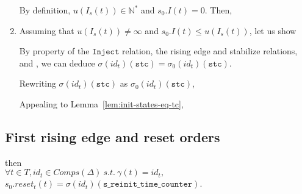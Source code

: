 \documentclass[dvipsnames,12pt]{article}
\begin{document}
\begin{niproof}
\begin{enumerate}
    By definition, $u(I_s(t))\in\mathbb{N}^{*}$ and
    $s_0.I(t)=0$. Then, 
    
  \item Assuming that $u(I_s(t))\neq\infty$ and
    $s_0.I(t)\le{}u(I_s(t))$, let us show\\

    By property of the $\mathtt{Inject}$ relation, the
    \hvhdl{} rising edge and stabilize relations, and \InCsCompT{}, we
    can deduce $\sigma(id_t)(\texttt{stc})=\sigma_0(id_t)(\texttt{stc})$.

    Rewriting $\sigma(id_t)(\texttt{stc})$ as $\sigma_0(id_t)(\texttt{stc})$,

    Appealing to Lemma~\ref{lem:init-states-eq-tc},
  \end{enumerate}
\end{niproof}

\subsection{First rising edge and reset orders}
\label{sec:fst-re-reset-orders}

\begin{lemma}
  \label{lem:fst-re-equal-reset-orders}
  \fstrehyps{} then\\
  $\forall{}t\in{}T,id_t\in{}Comps(\Delta)~s.t.~\gamma(t)=id_t,$
  $s_0.reset_t(t)=\sigma(id_t)(\texttt{s\_reinit\_time\_counter})$.
\end{lemma}
\end{document}
